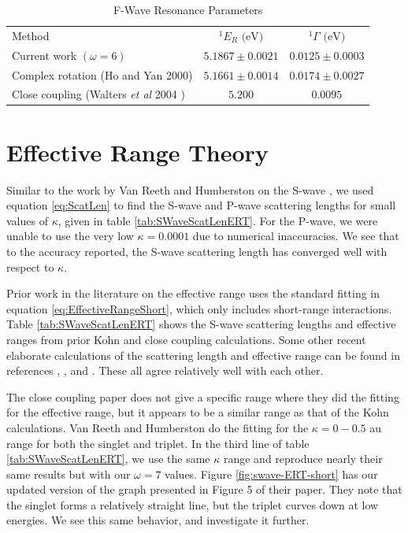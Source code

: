 \documentclass[preprint,showpacs,preprintnumbers,amsmath,amssymb]{revtex4}
\begin{document}
\begin{table}[H]
\begin{center}
\begin{ruledtabular}
\begin{tabular}{l c c}
Method & $^1E_R \text{ (eV)}$ & $^1\Gamma \text{ (eV)}$ \\
\colrule
Current work $(\omega = 6)$ & $5.1867 \pm 0.0021$ & $0.0125 \pm 0.0003$ \\
Complex rotation (Ho and Yan 2000) \cite{Ho2000} & $5.1661 \pm 0.0014$ & $0.0174 \pm 0.0027$  \\
Close coupling (Walters \emph{et al} 2004 \cite{Walters2004}) & $5.200$ & $0.0095$ \\
\end{tabular}
\end{ruledtabular}
\caption{F-Wave Resonance Parameters} %
\label{tab:FWaveResonances}
\end{center}
\end{table}



\section{Effective Range Theory}

Similar to the work by Van Reeth and Humberston on the S-wave \cite{VanReeth2003}, we used equation \ref{eq:ScatLen} to find the S-wave and P-wave scattering lengths for small values of $\kappa$, given in table \ref{tab:SWaveScatLenERT}. For the P-wave, we were unable to use the very low $\kappa = 0.0001$ due to numerical inaccuracies. We see that to the accuracy reported, the S-wave scattering length has converged well with respect to $\kappa$.

Prior work in the literature \cite{Blackwood2002,Walters2004,VanReeth2003} on the effective range uses the standard fitting in equation \ref{eq:EffectiveRangeShort}, which only includes short-range interactions. Table \ref{tab:SWaveScatLenERT} shows the S-wave scattering lengths and effective ranges from prior Kohn \cite{VanReeth2003} and close coupling \cite{Blackwood2002,Walters2004} calculations. Some other recent elaborate calculations of the scattering length and effective range can be found in references \cite{Sinha2000}, \cite{Chiesa2002}, and \cite{Ivanov2002}. These all agree relatively well with each other.

The close coupling paper \cite{Blackwood2002} does not give a specific range where they did the fitting for the effective range, but it appears to be a similar range as that of the Kohn calculations. Van Reeth and Humberston \cite{VanReeth2003} do the fitting for the $\kappa = 0-0.5$ au range for both the singlet and triplet. In the third line of table \ref{tab:SWaveScatLenERT}, we use the same $\kappa$ range and reproduce nearly their same results but with our $\omega = 7$ values. Figure \ref{fig:swave-ERT-short} has our updated version of the graph presented in Figure 5 of their paper. They note that the singlet forms a relatively straight line, but the triplet curves down at low energies. We see this same behavior, and investigate it further.
\end{document}
